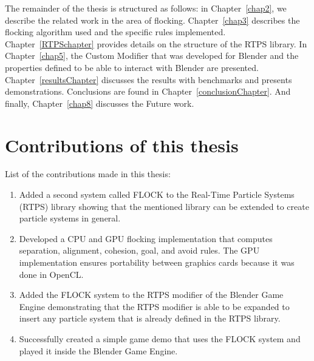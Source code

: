 
The remainder of the thesis is structured as follows:  in Chapter~\ref{chap2}, we describe the related work in the area of flocking. Chapter~\ref{chap3} describes the flocking algorithm used and the specific rules implemented. Chapter~\ref{RTPSchapter} provides details on the structure of the RTPS library. In Chapter~\ref{chap5}, the Custom Modifier that was developed for Blender and the properties defined to be able to interact with Blender are presented. Chapter~\ref{resultsChapter} discusses the results with benchmarks and presents demonstrations. Conclusions are found in Chapter~\ref{conclusionChapter}.  And finally, Chapter~\ref{chap8} discusses the Future work. 

\section{Contributions of this thesis}
List of the contributions made in this thesis:
\begin{enumerate}
\item Added a second system called FLOCK to the Real-Time Particle Systems (RTPS) library showing that the mentioned library can be extended to create particle systems in general.
\item Developed a CPU and GPU flocking implementation that computes separation, alignment, cohesion, goal, and avoid rules. The GPU implementation ensures portability between graphics cards because it was done in OpenCL. 
\item Added the FLOCK system to the RTPS modifier of the Blender Game Engine demonstrating that the RTPS modifier is able to be expanded to insert any particle system that is already defined in the RTPS library.
\item Successfully created a simple game demo that uses the FLOCK system and played it inside the Blender Game Engine.
\end{enumerate}
